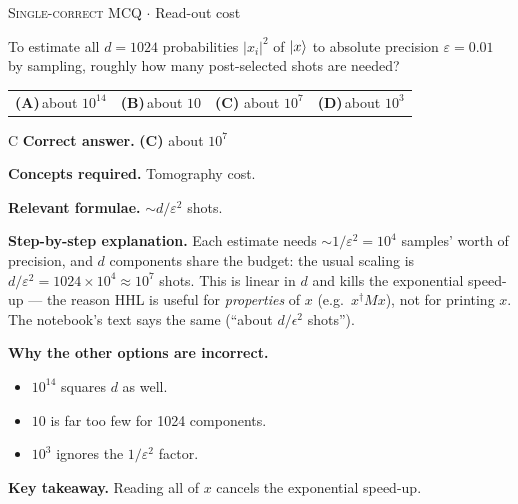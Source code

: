 \documentclass[11pt,a4paper]{article}
\newcommand{\optlabel}[1]{\textbf{(#1)}}
\newcommand{\correctlabel}[1]{\textcolor{okgreen}{\textbf{(#1)}\,\ding{51}}}
\newenvironment{qitem}[1]{\begin{list}{}{\setlength{\leftmargin}{3.3em}\setlength{\labelwidth}{3.1em}%
  \setlength{\labelsep}{0.2em}\setlength{\topsep}{3pt}\setlength{\parsep}{3pt}}\item[\textbf{Q.#1}\hfill]}{\end{list}}
\newcommand{\qsep}{\par\vspace{2pt}{\color{black!15}\hrule}\vspace{4pt}}
\newcommand{\qmeta}[2]{{\footnotesize\color{black!60}\textsc{#1} \;$\cdot$\; #2}\par}
\begin{document}
\begin{qitem}{63}
\qmeta{Single-correct MCQ}{Read-out cost}
To estimate all $d = 1024$ probabilities $|x_i|^2$ of $\ket x$ to absolute precision $\varepsilon = 0.01$ by sampling, roughly how many post-selected shots are needed?
\par\smallskip\noindent\begin{tabularx}{\linewidth}{@{}*{4}{L}@{}}
\optlabel{A}\,about $10^{14}$ & \optlabel{B}\,about $10$ & \correctlabel{C}\,about $10^7$ & \optlabel{D}\,about $10^3$
\end{tabularx}
\end{qitem}
\begin{solbox}{C}
\textbf{\color{brand}Correct answer.} \textcolor{okgreen}{\textbf{(C)}} about $10^7$

\textbf{\color{brand}Concepts required.} Tomography cost.

\textbf{\color{brand}Relevant formulae.} $\sim d/\varepsilon^2$ shots.

\textbf{\color{brand}Step-by-step explanation.} Each estimate needs $\sim1/\varepsilon^2 = 10^4$ samples' worth of precision, and $d$ components share the budget: the usual scaling is $d/\varepsilon^2 = 1024\times10^4 \approx 10^7$ shots. This is
linear in $d$ and kills the exponential speed-up --- the reason HHL is useful for \emph{properties} of $x$ (e.g.\ $x^\dagger Mx$), not for printing $x$. The notebook's text says the same
(``about $d/\epsilon^2$ shots'').

\textbf{\color{brand}Why the other options are incorrect.}
\begin{itemize}[leftmargin=2.4em, itemsep=1pt, topsep=2pt]
\item[\textbf{(A)}] $10^{14}$ squares $d$ as well.
\item[\textbf{(B)}] $10$ is far too few for 1024 components.
\item[\textbf{(D)}] $10^3$ ignores the $1/\varepsilon^2$ factor.
\end{itemize}
\textbf{\color{brand}Key takeaway.} Reading all of $x$ cancels the exponential speed-up.
\end{solbox}
\qsep
\end{document}
